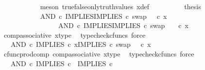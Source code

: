 \begin{isabellebody}
\ \ \ \ \ \ \ \ \ \ \isamarkupfalse%
\ {\isacharparenleft}{\kern0pt}meson\ true{\isacharunderscore}{\kern0pt}false{\isacharunderscore}{\kern0pt}only{\isacharunderscore}{\kern0pt}truth{\isacharunderscore}{\kern0pt}values\ x{\isacharunderscore}{\kern0pt}def{\isacharparenright}{\kern0pt}\isanewline
\ \ \ \ \ \ \ \ \isamarkupfalse%
\ {\isacharquery}{\kern0pt}thesis\isanewline
\ \ \ \ \ \ \ \ \isamarkupfalse%
\ {\isacharminus}{\kern0pt}\ \isanewline
\ \ \ \ \ \ \ \ \ \ \isamarkupfalse%
\ {\isachardoublequoteopen}{\isacharparenleft}{\kern0pt}AND\ {\isasymcirc}\isactrlsub c\ {\isasymlangle}IMPLIES{\isacharcomma}{\kern0pt}IMPLIES\ {\isasymcirc}\isactrlsub c\ swap\ {\isasymOmega}\ {\isasymOmega}{\isasymrangle}{\isacharparenright}{\kern0pt}\ {\isasymcirc}\isactrlsub c\ x\ {\isacharequal}{\kern0pt}\ \ \ \ \isanewline
\ \ \ \ \ \ \ \ \ \ \ \ \ \ \ \ \ AND\ {\isasymcirc}\isactrlsub c\ {\isasymlangle}IMPLIES{\isacharcomma}{\kern0pt}IMPLIES\ {\isasymcirc}\isactrlsub c\ swap\ {\isasymOmega}\ {\isasymOmega}{\isasymrangle}\ \ {\isasymcirc}\isactrlsub c\ x{\isachardoublequoteclose}\isanewline
\ \ \ \ \ \ \ \ \ \ \ \ \isamarkupfalse%
\ comp{\isacharunderscore}{\kern0pt}associative{}\ x{\isacharunderscore}{\kern0pt}type\ \isamarkupfalse%
\ {\isacharparenleft}{\kern0pt}typecheck{\isacharunderscore}{\kern0pt}cfuncs{\isacharcomma}{\kern0pt}\ force{\isacharparenright}{\kern0pt}\isanewline
\ \ \ \ \ \ \ \ \ \ \isamarkupfalse%
\ \isamarkupfalse%
\ {\isachardoublequoteopen}{\isachardot}{\kern0pt}{\isachardot}{\kern0pt}{\isachardot}{\kern0pt}\ {\isacharequal}{\kern0pt}\ AND\ {\isasymcirc}\isactrlsub c\ {\isasymlangle}IMPLIES\ {\isasymcirc}\isactrlsub c\ x{\isacharcomma}{\kern0pt}IMPLIES\ {\isasymcirc}\isactrlsub c\ swap\ {\isasymOmega}\ {\isasymOmega}\ {\isasymcirc}\isactrlsub c\ x{\isasymrangle}{\isachardoublequoteclose}\isanewline
\ \ \ \ \ \ \ \ \ \ \ \ \isamarkupfalse%
\ cfunc{\isacharunderscore}{\kern0pt}prod{\isacharunderscore}{\kern0pt}comp\ comp{\isacharunderscore}{\kern0pt}associative{}\ x{\isacharunderscore}{\kern0pt}type\ \isamarkupfalse%
\ {\isacharparenleft}{\kern0pt}typecheck{\isacharunderscore}{\kern0pt}cfuncs{\isacharcomma}{\kern0pt}\ force{\isacharparenright}{\kern0pt}\isanewline
\ \ \ \ \ \ \ \ \ \ \isamarkupfalse%
\ \isamarkupfalse%
\ {\isachardoublequoteopen}{\isachardot}{\kern0pt}{\isachardot}{\kern0pt}{\isachardot}{\kern0pt}\ {\isacharequal}{\kern0pt}\ AND\ {\isasymcirc}\isactrlsub c\ {\isasymlangle}IMPLIES\ {\isasymcirc}\isactrlsub c\ {\isasymlangle}{\isasymt}{\isacharcomma}{\kern0pt}{\isasymf}{\isasymrangle}{\isacharcomma}{\kern0pt}\ IMPLIES\ {\isasymcirc}\isactrlsub c\ {\isasymlangle}{\isasymf}{\isacharcomma}{\kern0pt}{\isasymt}{\isasymrangle}{\isasymrangle}{\isachardoublequoteclose}\isanewline

\end{isabellebody}
